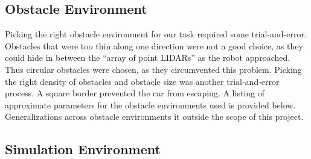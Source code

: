 \documentclass{article}
\begin{document}
\subsection{Obstacle Environment}
Picking the right obstacle environment for our task required some trial-and-error.  Obstacles that were too thin along one direction were not a good choice, as they could hide in between the ``array of point LIDARs'' as the robot approached.  Thus circular obstacles were chosen, as they circumvented this problem.  Picking the right density of obstacles and obstacle size was another trial-and-error process.  A square border prevented the car from escaping.  A listing of approximate parameters for the obstacle environments used is provided below.  Generalizations across obstacle environments it outside the scope of this project.


\subsection{Simulation Environment}
\end{document}
